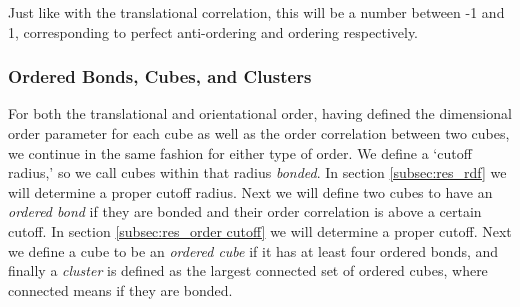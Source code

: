 \documentclass[thesis]{subfiles}
\begin{document}
Just like with the translational correlation, this will be a number between -1 and 1, corresponding to perfect anti-ordering and ordering respectively.

\subsubsection{Ordered Bonds, Cubes, and Clusters}

For both the translational and orientational order, having defined the dimensional order parameter for each cube as well as the order correlation between two cubes, we continue in the same fashion for either type of order. We define a `cutoff radius,' so we call cubes within that radius \emph{bonded}. In section \ref{subsec:res_rdf} we will determine a proper cutoff radius. Next we will define two cubes to have an \emph{ordered bond} if they are bonded and their order correlation is above a certain cutoff. In section \ref{subsec:res_order cutoff} we will determine a proper cutoff.
Next we define a cube to be an \emph{ordered cube} if it has at least four ordered bonds, and finally a \emph{cluster} is defined as the largest connected set of ordered cubes, where connected means if they are bonded.

\end{document}
